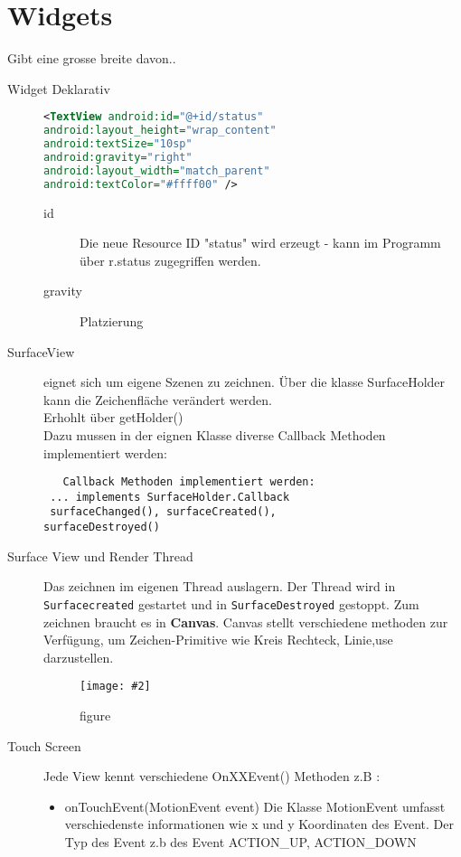 \documentclass[a4paper,10pt,titlepage=false]{scrreprt}
\newcommand{\pic}[2][figure]{\begin{figure}[h]
 \centering
 \texttt{[image: \#2]}
 \caption{#1}
\end{figure}
}
\begin{document}
\section{Widgets} Gibt eine grosse breite davon..
\begin{description}
\item[Widget Deklarativ] 
 \begin{lstlisting}[caption=Widget Beispiel,language=xml]
 	<TextView android:id="@+id/status"
android:layout_height="wrap_content"
android:textSize="10sp"
android:gravity="right"
android:layout_width="match_parent"
android:textColor="#ffff00" />
\end{lstlisting}
\begin{description}
\item[id] Die neue Resource ID "status" wird erzeugt - kann im Programm über r.status zugegriffen werden.
\item[gravity] Platzierung
\end{description}
\item[SurfaceView] eignet sich um eigene Szenen zu zeichnen. Über die klasse SurfaceHolder kann die Zeichenfläche verändert werden.\\
Erhohlt über getHolder()\\
Dazu mussen in der eignen Klasse diverse Callback Methoden implementiert werden:
\begin{verbatim}
   Callback Methoden implementiert werden:
 ... implements SurfaceHolder.Callback
 surfaceChanged(), surfaceCreated(),
surfaceDestroyed()
\end{verbatim}
\item[Surface View und Render Thread] Das zeichnen im eigenen Thread auslagern.
Der Thread wird in \texttt{Surfacecreated} gestartet und in \texttt{SurfaceDestroyed} gestoppt. Zum zeichnen braucht es in \textbf{Canvas}. Canvas stellt verschiedene methoden zur Verfügung, um Zeichen-Primitive wie Kreis Rechteck, Linie,use darzustellen.
\pic{canvloop.png}
\item[Touch Screen] Jede View kennt verschiedene OnXXEvent() Methoden z.B :
\begin{itemize}
  \item onTouchEvent(MotionEvent event)
  \subitem Die Klasse MotionEvent umfasst verschiedenste informationen wie x und y Koordinaten des Event. Der Typ des Event z.b  des Event ACTION\_UP, ACTION\_DOWN

\end{itemize}

\end{description}
\end{document}
